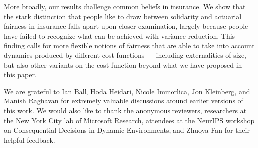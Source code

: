 \documentclass[sigconf]{acmart}
\begin{document}
More broadly, our results challenge common beliefs in insurance. We show that the stark distinction that people like to draw between solidarity and actuarial fairness in insurance falls apart upon closer examination, largely because people have failed to recognize what can be achieved with variance reduction. This finding calls for more flexible notions of fairness that are able to take into account dynamics produced by different cost functions --- including externalities of size, but also other variants on the cost function beyond what we have proposed in this paper.

\begin{acks}
We are grateful to Ian Ball, Hoda Heidari, Nicole Immorlica, Jon Kleinberg, and Manish Raghavan for extremely valuable discussions around earlier versions of this work. We would also like to thank the anonymous reviewers, researchers at the New York City lab of Microsoft Research, attendees at the NeurIPS workshop on Consequential Decisions in Dynamic Environments, and Zhuoya Fan for their helpful feedback. 
\end{acks}




\clearpage
\appendix
\end{document}
